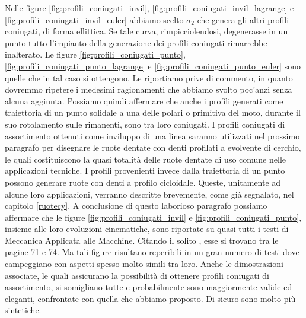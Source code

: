 \noindent Nelle figure \ref{fig:profili_coniugati_invil},
 \ref{fig:profili_coniugati_invil_lagrange} e
 \ref{fig:profili_coniugati_invil_euler} abbiamo scelto  $\sigma_2$ 
che genera gli altri profili coniugati, di forma ellittica. Se tale curva,
rimpicciolendosi, degenerasse in un punto tutto l'impianto della generazione
dei profili coniugati
rimarrebbe inalterato. Le figure
\ref{fig:profili_coniugati_punto},
\ref{fig:profili_coniugati_punto_lagrange} e
\ref{fig:profili_coniugati_punto_euler}
sono quelle che in tal caso
si ottengono. Le riportiamo
prive di commento, in quanto dovremmo ripetere i medesimi
ragionamenti che abbiamo svolto poc'anzi senza alcuna aggiunta.
Possiamo quindi affermare che anche i profili generati
come traiettoria di un punto solidale a una delle polari o primitiva del moto,
durante il suo rotolamento sulle rimanenti,
sono tra loro coniugati. 
I profili coniugati di assortimento ottenuti come inviluppo
di una linea saranno utilizzati nel prossimo paragrafo per disegnare
le ruote dentate con denti profilati a evolvente di cerchio,
le quali costituiscono la quasi totalit\`a delle ruote dentate di
uso comune nelle applicazioni tecniche.
I profili provenienti invece dalla traiettoria di un punto possono
generare ruote con denti a profilo
cicloidale. Queste, unitamente ad alcune loro applicazioni,
verranno descritte brevemente, come gi\`a segnalato, nel capitolo
\ref{ruotecy}.
A conclusione di questo laborioso paragrafo possiamo affermare
che le figure \ref{fig:profili_coniugati_invil} e
\ref{fig:profili_coniugati_punto}, insieme alle loro evoluzioni cinematiche,
sono riportate su quasi
tutti i testi di Meccanica Applicata alle Macchine. Citando il solito
\cite{sesini1}, esse si trovano tra le pagine 71 e 74. Ma tali figure
risultano reperibili in un gran numero di testi
dove campeggiano con aspetti spesso molto simili tra loro. Anche le dimostrazioni
associate, le quali assicurano la possibilit\`a di
 ottenere profili coniugati di 
assortimento, si somigliano tutte e probabilmente sono maggiormente
 valide ed eleganti, confrontate con quella che 
abbiamo proposto. Di sicuro sono molto pi\`u sintetiche.

